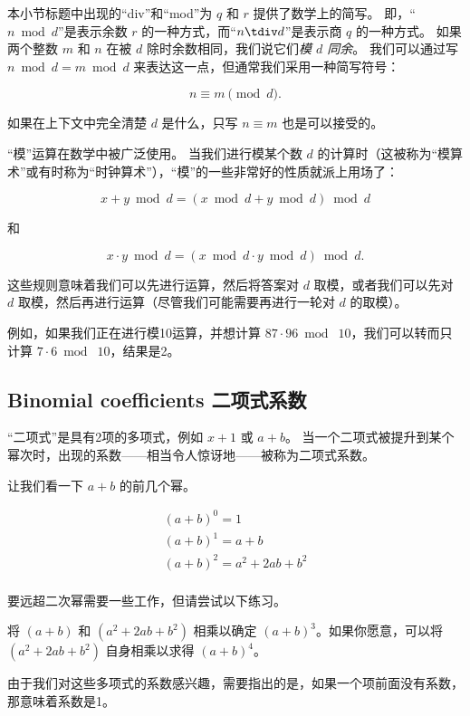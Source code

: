 本小节标题中出现的“div”和“mod”为 $q$ 和 $r$ 提供了数学上的简写。
即，“$n \bmod d$”是表示余数 $r$ 的一种方式，而“$n \tdiv d$”是表示商 $q$ 的一种方式。
如果两个整数 $m$ 和 $n$ 在被 $d$ 除时余数相同，我们说它们\emph{模 $d$ 同余}。
我们可以通过写 $n \bmod d = m \bmod d$ 来表达这一点，但通常我们采用一种简写符号：

\[ n \equiv m \pmod{d}.
\]

如果在上下文中完全清楚 $d$ 是什么，只写 $n \equiv m$ 也是可以接受的。

“模”运算在数学中被广泛使用。
当我们进行模某个数 $d$ 的计算时（这被称为“模算术”或有时称为“时钟算术”），“模”的一些非常好的性质就派上用场了：

\[ x + y \bmod d = ( x \bmod d + y \bmod d ) \bmod d \]

\noindent 和

\[ x \cdot y \bmod d = ( x \bmod d \cdot y \bmod d ) \bmod d.
\]

这些规则意味着我们可以先进行运算，然后将答案对 $d$ 取模，或者我们可以先对 $d$ 取模，然后再进行运算（尽管我们可能需要再进行一轮对 $d$ 的取模）。

例如，如果我们正在进行模10运算，并想计算 $87 \cdot 96 \bmod\; 10$，我们可以转而只计算 $7 \cdot 6 \bmod\; 10$，结果是2。

\subsection{Binomial coefficients 二项式系数}
\label{binom_coeff}

“二项式”是具有2项的多项式，例如 $x+1$ 或 $a+b$。
当一个二项式被提升到某个幂次时，出现的系数——相当令人惊讶地——被称为二项式系数。

让我们看一下 $a+b$ 的前几个幂。

\begin{gather*}
  (a+b)^0 = 1 \\
  (a+b)^1 = a+b \\
  (a+b)^2 = a^2 + 2ab + b^2 \\
\end{gather*}

要远超二次幂需要一些工作，但请尝试以下练习。

\begin{exer}
  将 $(a+b)$ 和 $(a^2 + 2ab + b^2)$ 相乘以确定 $(a+b)^3$。如果你愿意，可以将 $(a^2 + 2ab + b^2)$ 自身相乘以求得 $(a+b)^4$。
\end{exer}

由于我们对这些多项式的系数感兴趣，需要指出的是，如果一个项前面没有系数，那意味着系数是1。

